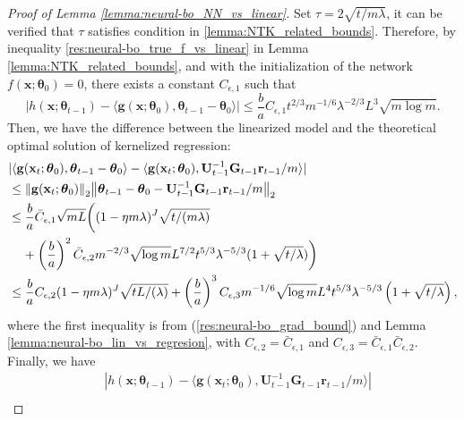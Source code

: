 \begin{proof}[Proof of Lemma \ref{lemma:neural-bo_NN_vs_linear}]

Set $\tau=2\sqrt{t/m\lambda}$, it can be verified that $\tau$ satisfies condition in \ref{lemma:NTK_related_bounds}. Therefore,  by inequality \eqref{res:neural-bo_true_f_vs_linear} in Lemma \ref{lemma:NTK_related_bounds}, and with the initialization of the network $f(\mathbf{x};\boldsymbol{\theta}_0) = 0$, there exists a constant $C_{\epsilon,1}$ such that
\[\left \lvert h(\mathbf{x}; \boldsymbol{\theta}_{t-1}) - \langle \mathbf{g}(\mathbf{x}; \boldsymbol{\theta}_0), \boldsymbol{\theta}_{t-1} - \boldsymbol{\theta}_0 \rangle  \right\rvert  \leq  \frac{b}{a} C_{\epsilon,1}   t^{2/3}m^{-1/6}\lambda^{-2/3} L^{3}\sqrt{m\log m}. \]
Then, we have the difference between the linearized model and the theoretical optimal solution of kernelized regression:
\begin{align*}
        & \lvert \langle\mathbf{g}(\mathbf{x}_{t};\boldsymbol{\theta}_{0}),\boldsymbol{\theta}_{t-1}-\boldsymbol{\theta}_{0}\rangle-\langle\mathbf{g}(\mathbf{x}_{t};\boldsymbol{\theta}_{0}),\mathbf{U}_{t-1}^{-1}\mathbf{G}_{t-1}\mathbf{r}_{t-1}/m\rangle \rvert \\
        & \leq \norm{\mathbf{g}(\mathbf{x}_t;\boldsymbol{\theta}_0)}_2 \norm{\boldsymbol{\theta}_{t-1}-\boldsymbol{\theta}_{0} - \mathbf{U}_{t-1}^{-1}\mathbf{G}_{t-1}\mathbf{r}_{t-1}/m}_2\\
        & \le \frac{b}{a} \Bar{C}_{\epsilon,1} \sqrt{mL} \bigg((1-\eta m\lambda)^{J}\sqrt{t/(m\lambda)} \\ & \;\;\;\; +\left(\frac{b}{a}\right)^2 \Bar{C}_{\epsilon, 2}m^{-2/3}\sqrt{\log m}L^{7/2}t^{5/3}\lambda^{-5/3}(1+\sqrt{t/\lambda}) \bigg)\\
        & \le \frac{b}{a} C_{\epsilon,2} (1-\eta m\lambda)^{J} \sqrt{tL/(\lambda)} +  \left(\frac{b}{a} \right)^3 C_{\epsilon,3} m^{-1/6} \sqrt{\log m} L^4 t^{5/3} \lambda ^{-5/3} \left(1 + \sqrt{t/\lambda} \right),
\end{align*}
where the first inequality is from (\ref{res:neural-bo_grad_bound}) and Lemma \ref{lemma:neural-bo_lin_vs_regresion}, with $C_{\epsilon,2} = \bar C_{\epsilon,1}$ and  $C_{\epsilon,3} = \bar C_{\epsilon,1} \bar C_{\epsilon,2}$.
Finally, we have 
\begin{align*}
        & \left \lvert h(\mathbf{x}; \boldsymbol{\theta}_{t-1}) - \langle \mathbf{g}(\mathbf{x}_{t};\boldsymbol{\theta}_{0}),\mathbf{U}_{t-1}^{-1}\mathbf{G}_{t-1}\mathbf{r}_{t-1}/m\rangle \right\rvert \\

\end{align*}
\end{proof}

